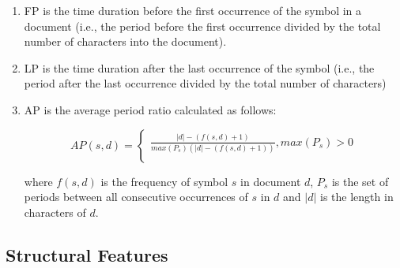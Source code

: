 \begin{enumerate}
\item FP is the time duration before the first occurrence of the symbol in a document (i.e., the period before the first occurrence divided by the total number of characters into the document).
\item LP is the time duration after the last occurrence of the symbol (i.e., the period after the last occurrence divided by the total number of characters)
\item AP is the average period ratio calculated as follows:

\begin{equation}\label{chap:relevant_work:sec:word_embendding}
	AP(s,d)  =
      \begin{cases}
        \frac{\vert d \vert - (f(s,d) +1)}{max(P_s)(\vert d \vert - (f(s,d) +1))}, max(P_s) > 0 \\ 
       \end{cases}
\end{equation}

\noindent
where $f(s,d)$ is the frequency of symbol $s$ in document $d$, $P_s$ is the set of periods between all consecutive occurrences of $s$ in $d$ and $\vert d \vert$ is the length in characters of $d$. 

\end{enumerate}


\subsection{Structural Features}

